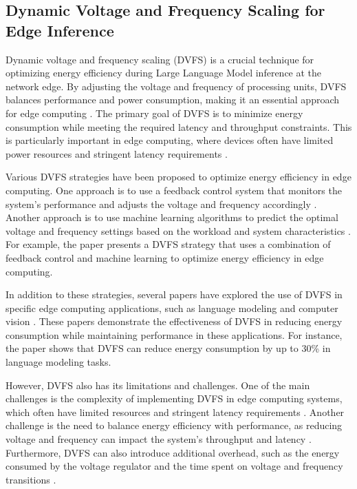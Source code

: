 \documentclass[11pt,a4paper]{article}
\begin{document}
\subsection{Dynamic Voltage and Frequency Scaling for Edge Inference}


Dynamic voltage and frequency scaling (DVFS) is a crucial technique for optimizing energy efficiency during Large Language Model inference at the network edge. By adjusting the voltage and frequency of processing units, DVFS balances performance and power consumption, making it an essential approach for edge computing \cite{arxiv:2103.00768}. The primary goal of DVFS is to minimize energy consumption while meeting the required latency and throughput constraints. This is particularly important in edge computing, where devices often have limited power resources and stringent latency requirements \cite{doi:10.1109/tcc.2020.2978846}.

Various DVFS strategies have been proposed to optimize energy efficiency in edge computing. One approach is to use a feedback control system that monitors the system's performance and adjusts the voltage and frequency accordingly \cite{arxiv:2204.03326}. Another approach is to use machine learning algorithms to predict the optimal voltage and frequency settings based on the workload and system characteristics \cite{doi:10.1145/3701997}. For example, the \cite{arxiv:2103.00768} paper presents a DVFS strategy that uses a combination of feedback control and machine learning to optimize energy efficiency in edge computing.

In addition to these strategies, several papers have explored the use of DVFS in specific edge computing applications, such as language modeling \cite{arxiv:2112.06905} and computer vision \cite{doi:10.1080/01621459.2017.1341413}. These papers demonstrate the effectiveness of DVFS in reducing energy consumption while maintaining performance in these applications. For instance, the \cite{arxiv:2112.06905} paper shows that DVFS can reduce energy consumption by up to 30\% in language modeling tasks.

However, DVFS also has its limitations and challenges. One of the main challenges is the complexity of implementing DVFS in edge computing systems, which often have limited resources and stringent latency requirements \cite{doi:10.1109/access.2024.3351308}. Another challenge is the need to balance energy efficiency with performance, as reducing voltage and frequency can impact the system's throughput and latency \cite{arxiv:2411.01433}. Furthermore, DVFS can also introduce additional overhead, such as the energy consumed by the voltage regulator and the time spent on voltage and frequency transitions \cite{doi:10.1109/lca.2025.3592563}.
\end{document}
